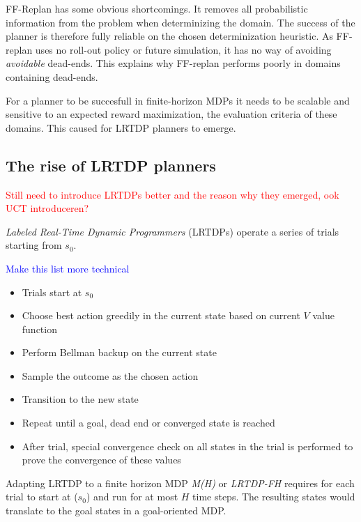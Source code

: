 \documentclass[runningheads,a4paper]{llncs}
\newcommand\myworries[1]{\textcolor{red}{#1}}
\newcommand\todo[1]{\textcolor{blue}{#1}}
\begin{document}
FF-Replan has some obvious shortcomings. It removes all probabilistic information from the problem when determinizing the domain. The success of the planner is therefore fully reliable on the chosen determinization heuristic. As FF-replan uses no roll-out policy or future simulation, it has no way of avoiding \emph{avoidable} dead-ends. This explains why FF-replan performs poorly in domains containing dead-ends.

For a planner to be succesfull in finite-horizon MDPs it needs to be scalable and sensitive to an expected reward maximization, the evaluation criteria of these domains. This caused for  LRTDP planners to emerge.


\subsection{The rise of LRTDP planners}

\myworries{Still need to introduce LRTDPs better and the reason why they emerged, ook UCT introduceren?}

\emph{Labeled Real-Time Dynamic Programmers} (LRTDPs) operate a series of trials starting from $s_0$.

\todo{Make this list more technical}

\begin{itemize}
	\item Trials start at $s_0$
	\item Choose best action greedily in the current state based on current $V$ value function
	\item Perform Bellman backup on the current state
	\item Sample the outcome as the chosen action
	\item Transition to the new state
	\item Repeat until a goal, dead end or converged state is reached
	\item After trial, special convergence check on all states in the trial is performed to prove the convergence of these values
\end{itemize}

Adapting LRTDP to a finite horizon MDP \emph{M(H)} or \emph{LRTDP-FH} requires for each trial to start at ($s_0$) and run for at most $H$ time steps. The resulting states would translate to the goal states in a goal-oriented MDP. \\
\end{document}

